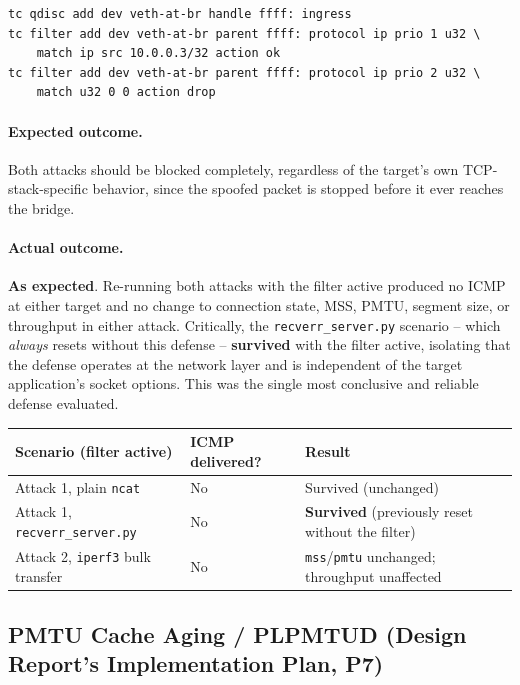\documentclass[11pt]{article}
\newcommand{\worked}{\textcolor{green!50!black}{\textbf{As expected}}}
\begin{document}
\begin{verbatim}
tc qdisc add dev veth-at-br handle ffff: ingress
tc filter add dev veth-at-br parent ffff: protocol ip prio 1 u32 \
    match ip src 10.0.0.3/32 action ok
tc filter add dev veth-at-br parent ffff: protocol ip prio 2 u32 \
    match u32 0 0 action drop
\end{verbatim}

\paragraph{Expected outcome.} Both attacks should be blocked completely,
regardless of the target's own TCP-stack-specific behavior, since the
spoofed packet is stopped before it ever reaches the bridge.

\paragraph{Actual outcome.} \worked. Re-running both attacks with the
filter active produced no ICMP at either target and no change to
connection state, MSS, PMTU, segment size, or throughput in either
attack. Critically, the \texttt{recverr\_server.py} scenario -- which
\emph{always} resets without this defense -- \textbf{survived} with the
filter active, isolating that the defense operates at the network layer
and is independent of the target application's socket options. This
was the single most conclusive and reliable defense evaluated.

\begin{center}
\begin{tabular}{@{}lll@{}}
\toprule
\textbf{Scenario (filter active)} & \textbf{ICMP delivered?} & \textbf{Result} \\
\midrule
Attack 1, plain \texttt{ncat} & No & Survived (unchanged) \\
Attack 1, \texttt{recverr\_server.py} & No & \textbf{Survived} (previously reset without the filter) \\
Attack 2, \texttt{iperf3} bulk transfer & No & \texttt{mss}/\texttt{pmtu} unchanged; throughput unaffected \\
\bottomrule
\end{tabular}
\end{center}

\subsection{PMTU Cache Aging / PLPMTUD (Design Report's Implementation Plan, P7)}
\end{document}
